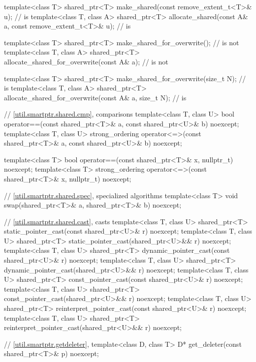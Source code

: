 \begin{codeblock}
{  template<class T>
    shared_ptr<T> make_shared(const remove_extent_t<T>& u);                     //  is 
  template<class T, class A>
    shared_ptr<T> allocate_shared(const A& a, const remove_extent_t<T>& u);     //  is 

  template<class T>
    shared_ptr<T> make_shared_for_overwrite();                                  //  is not 
  template<class T, class A>
    shared_ptr<T> allocate_shared_for_overwrite(const A& a);                    //  is not 

  template<class T>
    shared_ptr<T> make_shared_for_overwrite(size_t N);                          //  is 
  template<class T, class A>
    shared_ptr<T> allocate_shared_for_overwrite(const A& a, size_t N);          //  is 

  // \ref{util.smartptr.shared.cmp},  comparisons
  template<class T, class U>
    bool operator==(const shared_ptr<T>& a, const shared_ptr<U>& b) noexcept;
  template<class T, class U>
    strong_ordering operator<=>(const shared_ptr<T>& a, const shared_ptr<U>& b) noexcept;

  template<class T>
    bool operator==(const shared_ptr<T>& x, nullptr_t) noexcept;
  template<class T>
    strong_ordering operator<=>(const shared_ptr<T>& x, nullptr_t) noexcept;

  // \ref{util.smartptr.shared.spec},  specialized algorithms
  template<class T>
    void swap(shared_ptr<T>& a, shared_ptr<T>& b) noexcept;

  // \ref{util.smartptr.shared.cast},  casts
  template<class T, class U>
    shared_ptr<T> static_pointer_cast(const shared_ptr<U>& r) noexcept;
  template<class T, class U>
    shared_ptr<T> static_pointer_cast(shared_ptr<U>&& r) noexcept;
  template<class T, class U>
    shared_ptr<T> dynamic_pointer_cast(const shared_ptr<U>& r) noexcept;
  template<class T, class U>
    shared_ptr<T> dynamic_pointer_cast(shared_ptr<U>&& r) noexcept;
  template<class T, class U>
    shared_ptr<T> const_pointer_cast(const shared_ptr<U>& r) noexcept;
  template<class T, class U>
    shared_ptr<T> const_pointer_cast(shared_ptr<U>&& r) noexcept;
  template<class T, class U>
    shared_ptr<T> reinterpret_pointer_cast(const shared_ptr<U>& r) noexcept;
  template<class T, class U>
    shared_ptr<T> reinterpret_pointer_cast(shared_ptr<U>&& r) noexcept;

  // \ref{util.smartptr.getdeleter},  
  template<class D, class T>
    D* get_deleter(const shared_ptr<T>& p) noexcept;

}
\end{codeblock}
